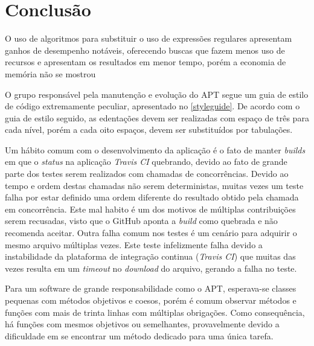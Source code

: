 \chapter{Conclusão} %
\label{cha:dificuldades_encontradas}


O uso de algoritmos para substituir o uso de expressões regulares apresentam ganhos de desempenho notáveis, oferecendo buscas que fazem menos uso de recursos e apresentam os resultados em menor tempo, porém a economia de memória não se mostrou  


O grupo responsável pela manutenção e evolução do {\code APT} segue um guia de estilo de código extremamente peculiar, apresentado no \autoref{styleguide}. De acordo com o guia de estilo seguido, as edentações devem ser realizadas com espaço de três para cada nível, porém a cada oito espaços, devem ser substituídos por tabulações.


Um hábito comum com o desenvolvimento da aplicação é o fato de manter \textit{builds} em que o \textit{status} na aplicação \textit{Travis CI} quebrando, devido ao fato de grande parte dos testes serem realizados com chamadas de concorrências. Devido ao tempo e ordem destas chamadas não serem deterministas, muitas vezes um teste falha por estar definido uma ordem diferente do resultado obtido pela chamada em concorrência.
Este mal habito é um dos motivos de múltiplas contribuições serem recusadas, visto que o GitHub aponta a \textit{build} como quebrada e não recomenda aceitar. Outra falha comum nos testes é um cenário para adquirir o mesmo arquivo múltiplas vezes. Este teste infelizmente falha devido a instabilidade da plataforma de integração continua (\textit{Travis CI}) que muitas das vezes resulta em um \textit{timeout} no \textit{download} do arquivo, gerando a falha no teste.



Para um software de grande responsabilidade como o APT, esperava-se classes pequenas com métodos objetivos e coesos, porém é comum observar métodos e funções com mais de trinta linhas com múltiplas obrigações. Como consequência, há funções com mesmos objetivos ou semelhantes, provavelmente devido a dificuldade em se encontrar um método dedicado para uma única tarefa.

